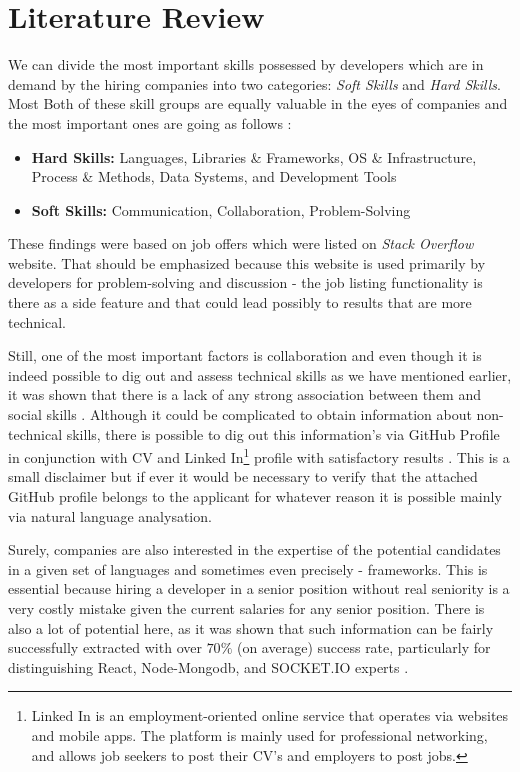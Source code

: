 \section{Literature Review}
\label{sec:literature-review}

We can divide the most important skills possessed by developers which are in demand by the hiring companies into two categories: \emph{Soft Skills} and \emph{Hard Skills}. Most Both of these skill groups are equally valuable in the eyes of companies and the most important ones are going as follows \cite{StackOverflowStudies}:

\begin{itemize}
  \item \textbf{Hard Skills:} Languages, Libraries \& Frameworks, OS \& Infrastructure, Process \& Methods, Data Systems, and Development Tools
  \item \textbf{Soft Skills:} Communication, Collaboration, Problem-Solving
\end{itemize}

These findings were based on job offers which were listed on \emph{Stack Overflow} website. That should be emphasized because this website is used primarily by developers for problem-solving and discussion - the job listing functionality is there as a side feature and that could lead possibly to results that are more technical.

Still, one of the most important factors is collaboration \cite{WhatMakesGoodDev} and even though it is indeed possible to dig out and assess technical skills as we have mentioned earlier, it was shown that there is a lack of any strong association between them and social skills \cite{WhatMakesGoodDev}. Although it could be complicated to obtain information about non-technical skills, there is possible to dig out this information's via GitHub Profile in conjunction with CV and Linked In\footnote{Linked In is an employment-oriented online service that operates via websites and mobile apps. The platform is mainly used for professional networking, and allows job seekers to post their CV's and employers to post jobs.} profile with satisfactory results \cite{CandidateSelection}. This is a small disclaimer but if ever it would be necessary to verify that the attached GitHub profile belongs to the applicant for whatever reason it is possible \cite{GitHubProfilesToJobAdv} mainly via  natural language analysation.

Surely, companies are also interested in the expertise of the potential candidates in a given set of languages and sometimes even precisely - frameworks. This is essential because hiring a developer in a senior position without real seniority is a very costly mistake given the current salaries for any senior position. There is also a lot of potential here, as it was shown that such information can be fairly successfully extracted with over $70\%$ (on average) success rate, particularly for distinguishing React, Node-Mongodb, and SOCKET.IO experts \cite{SoftwareLibraries}.

